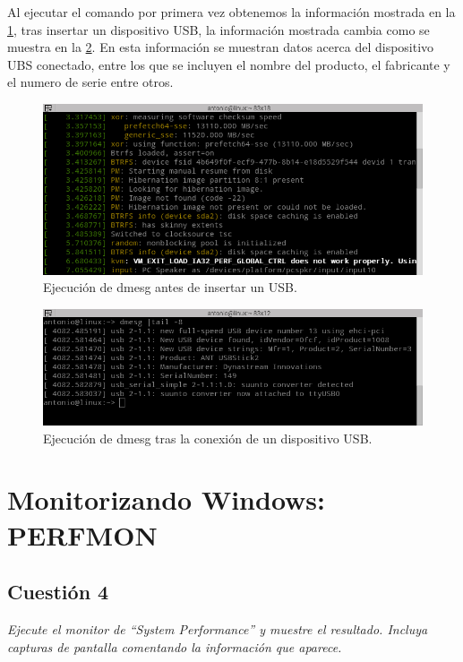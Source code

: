 Al ejecutar el comando por primera vez obtenemos la información mostrada en la  \cref{fig2}, tras insertar un dispositivo USB, la información mostrada cambia como se muestra en la  \cref{fig3}. En esta información se muestran datos acerca del dispositivo UBS conectado, entre los que se incluyen el nombre del producto, el fabricante y el numero de serie entre otros.
\begin{figure}[H]
  \begin{center}
    \includegraphics[width=1\textwidth]{imagenes/dmesg1}
    \caption{Ejecución de dmesg antes de insertar un USB.}
    \label{fig2}
  \end{center}
\end{figure}
\begin{figure}[H]
  \begin{center}
    \includegraphics[width=1\textwidth]{imagenes/dmesg2}
    \caption{Ejecución de dmesg tras la conexión de un dispositivo USB.}
    \label{fig3}
  \end{center}
\end{figure}

\section{Monitorizando Windows: PERFMON}
\subsection{Cuestión 4}
\textit{Ejecute el monitor de “System Performance” y muestre el resultado. Incluya capturas de pantalla comentando la información que aparece.}
\newline

